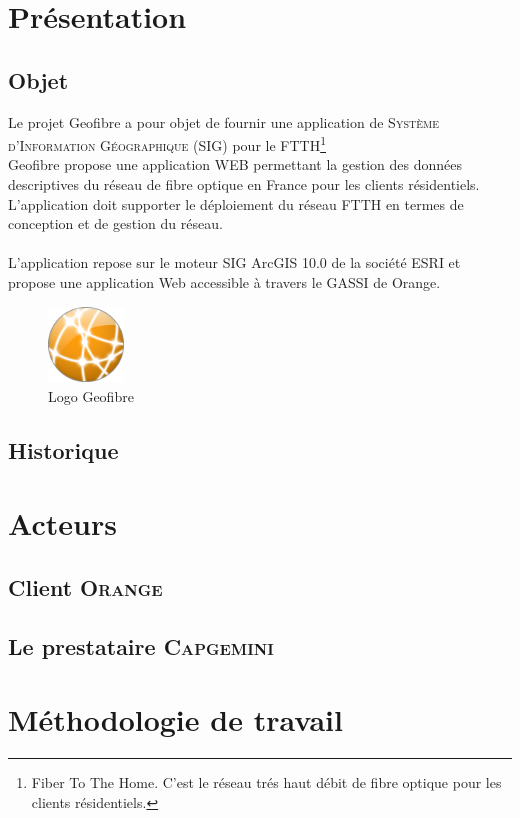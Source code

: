 \chapter{Présentation}

	\section{Objet}
Le projet Geofibre a pour objet de fournir une application de \textsc{Système d'Information Géographique (SIG)} pour le FTTH\footnote{Fiber To The Home. C'est le réseau trés haut débit de fibre optique pour les clients résidentiels.}\\
Geofibre propose une application WEB permettant la gestion des données descriptives du réseau de fibre optique en France pour les clients résidentiels.\\
L'application doit supporter le déploiement du réseau FTTH en termes de conception et de gestion du réseau. \\
\\
L'application repose sur le moteur SIG ArcGIS 10.0 de la société ESRI et propose une application Web accessible à travers le GASSI de Orange.

	\begin{figure}
		\centering
			\includegraphics[width=2cm, height=2cm]{images/logo_geofibre.png}
			\caption{Logo Geofibre}
	\end{figure}

	\section{Historique}
	\chapter{Acteurs}
		\section{Client \textsc{Orange}}
		\section{Le prestataire \textsc{Capgemini}}
	\chapter{Méthodologie de travail}
